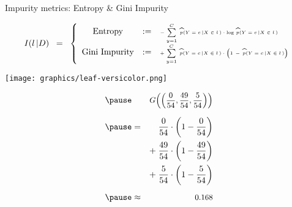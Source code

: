
\begin{frame}{\vskip -0.2cm \Large Impurity metrics: Entropy \& Gini Impurity}

\vskip -0.2cm
\tiny
\begin{equation*}
I(l\,\vert D)
\;\; = \;\;
\left\{\begin{array}{ccl}
\textnormal{Entropy}
& := &
	\textnormal{\tiny$-\;\overset{C}{\underset{y=1}{\sum}}\;\,
	\widehat{p}(Y=c\,\vert X\in l\,) \cdot \log\,\widehat{p}(Y=c\,\vert X\in l\,)$}
\\
\textnormal{Gini Impurity}
& := &
	\textnormal{\tiny$+\;\overset{C}{\underset{y=1}{\sum}}\;\,
	\widehat{p}(Y=c\,\vert X\in l\,) \cdot
	\left(\overset{{\color{white}.}}{1}\,-\,\widehat{p}(Y=c\,\vert X\in l\,)\right)$}
\end{array}\right.
\end{equation*}

\begin{multicols}{2}

	\begin{minipage}{4.5cm}

		\begin{center}
		\vskip 0.1cm
		\pause
		\texttt{[image: graphics/leaf-versicolor.png]}
		\end{center}

		\begin{flushleft}
		\vskip -0.8cm
		{\scriptsize
		\begin{eqnarray*}
		\pause
		&&
			\textnormal{\small$G\!\left(\left(\frac{0}{54},\frac{49}{54},\frac{5}{54}\right)\right)$}
		\\
		\pause
		& = &
			{\color{white}+} \;\frac{\overset{{\color{white}1}}{0}}{54} \cdot \left( 1 - \frac{0}{54} \right)
		\\
		&&
			+ \;\frac{49}{54} \cdot \left( 1 - \frac{49}{54} \right)
		\\
		&&
			+ \;\frac{5}{54} \cdot \left( 1 - \frac{5}{54} \right)
		\\
		\pause
		& \approx &
			\overset{{\color{white}-}}{\textnormal{\small$0.168$}}
		\end{eqnarray*}
		}
		\end{flushleft}

	\end{minipage}
	
\columnbreak


\end{multicols}
\end{frame}
